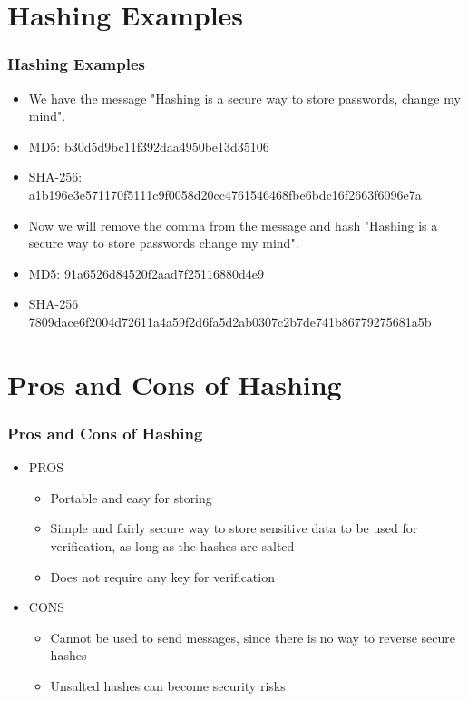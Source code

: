 \documentclass{beamer}
\begin{document}
\section{Hashing Examples}

\begin{frame}
\frametitle{Hashing Examples}
	\begin{itemize}
		\item We have the message "Hashing is a secure way to store passwords, change my mind".
		\item MD5: b30d5d9bc11f392daa4950be13d35106
		\item SHA-256: a1b196e3e571170f5111c9f0058d20cc4761546468fbe6bdc16f2663f6096e7a
		\item Now we will remove the comma from the message and hash "Hashing is a secure way to store passwords change my mind".
		\item MD5: 91a6526d84520f2aad7f25116880d4e9
		\item SHA-256 7809dace6f2004d72611a4a59f2d6fa5d2ab0307c2b7de741b86779275681a5b
	\end{itemize}
\end{frame}

\section{Pros and Cons of Hashing}

\begin{frame}
\frametitle{Pros and Cons of Hashing}
	\begin{itemize}
		\item PROS
		\begin{itemize}
			\item Portable and easy for storing
			\item Simple and fairly secure way to store sensitive data to be used for verification, as long as the hashes are salted
			\item Does not require any key for verification 
		\end{itemize}
		\item CONS
		\begin{itemize}
			\item Cannot be used to send messages, since there is no way to reverse secure hashes
			\item Unsalted hashes can become security risks   
		\end{itemize}
		
	\end{itemize}
\end{frame}
\end{document}
